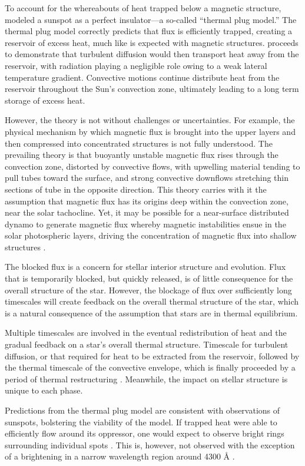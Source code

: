 To account for the whereabouts of heat trapped below a magnetic structure, \citet{Spruit1977} modeled a sunspot as a perfect insulator---a so-called ``thermal plug model.'' The thermal plug model correctly predicts that flux is efficiently trapped, creating a reservoir of excess heat, much like is expected with magnetic structures. \citet{Spruit1977} proceeds to demonstrate that turbulent diffusion would then transport heat away from the reservoir, with radiation playing a negligible role owing to a weak lateral temperature gradient. Convective motions continue distribute heat from the reservoir throughout the Sun's convection zone, ultimately leading to a long term storage of excess heat.

However, the theory is not without challenges or uncertainties. For example, the physical mechanism by which magnetic flux is brought into the upper layers and then compressed into concentrated structures is not fully understood. The prevailing theory is that buoyantly unstable magnetic flux rises through the convection zone, distorted by convective flows, with upwelling material tending to pull tubes toward the surface, and strong convective downflows stretching thin sections of tube in the opposite direction. This theory carries with it the assumption that magnetic flux has its origins deep within the convection zone, near the solar tachocline. Yet, it may be possible for a near-surface distributed dynamo to generate magnetic flux \citep{Brandenburg2005b} whereby magnetic instabilities ensue in the solar photospheric layers, driving the concentration of magnetic flux into shallow structures \citep[the so-called negative effective magnetic pressure instability][]{Brandenburg2011}.

The blocked flux is a concern for stellar interior structure and evolution. Flux that is temporarily blocked, but quickly released, is of little consequence for the overall structure of the star. However, the blockage of flux over sufficiently long timescales will create feedback on the overall thermal structure of the star, which is a natural consequence of the assumption that stars are in thermal equilibrium. 

Multiple timescales are involved in the eventual redistribution of heat and the gradual feedback on a star's overall thermal structure. Timescale for turbulent diffusion, or that required for heat to be extracted from the reservoir, followed by the thermal timescale of the convective envelope, which is finally proceeded by a period of thermal restructuring \citep{Spruit1982a}. Meanwhile, the impact on stellar structure is unique to each phase.

Predictions from the thermal plug model are consistent with observations of sunspots, bolstering the viability of the model. If trapped heat were able to efficiently flow around its oppressor, one would expect to observe bright rings surrounding individual spots \citep{Spruit1982b}. This is, however, not observed with the exception of a brightening in a narrow wavelength region around 4300 Å \citep{Bray1964}. 
